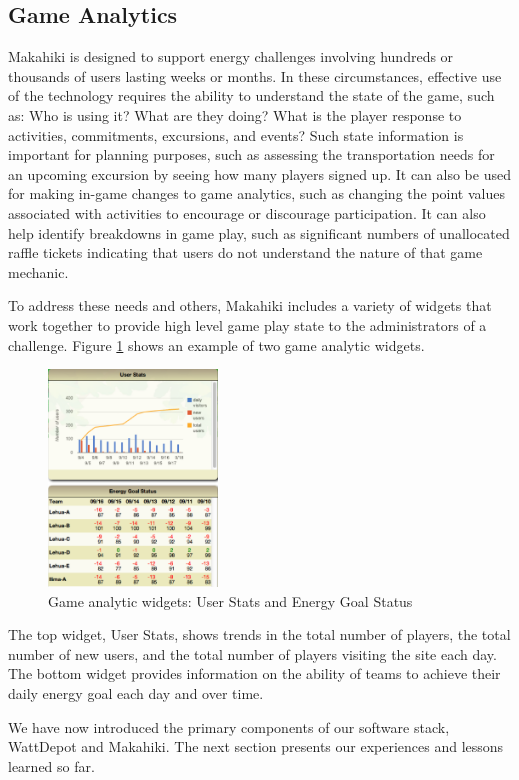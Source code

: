 \subsection{Game Analytics}

Makahiki is designed to support energy challenges involving hundreds or thousands of users lasting weeks or months.  In these circumstances, effective use of the technology requires the ability to understand the state of the game, such as: Who is using it? What are they doing? What is the player response to activities, commitments, excursions, and events?   Such state information is important for planning purposes, such as assessing the transportation needs for an upcoming excursion by seeing how many players signed up.   It can also be used for making in-game changes to game analytics, such as changing the point values associated with activities to encourage or discourage participation.  It can also help identify breakdowns in game play, such as significant numbers of unallocated raffle tickets indicating that users do not understand the nature of that game mechanic.  

To address these needs and others, Makahiki includes a variety of widgets that work together to provide high level game play state to the administrators of a challenge. Figure \ref{fig:status} shows an example of two game analytic widgets.

\begin{figure}[t!]
  \center
  \includegraphics[width=0.4\textwidth]{status.eps}
  \caption{Game analytic widgets: User Stats and Energy Goal Status}
  \label{fig:status}
\end{figure}

The top widget, User Stats, shows trends in the total number of players, the total number of new users, and the total number of players visiting the site each day.  The bottom widget provides information on the ability of teams to achieve their daily energy goal each day and over time.  

We have now introduced the primary components of our software stack, WattDepot and Makahiki.  The next section presents our experiences and lessons learned so far. 



